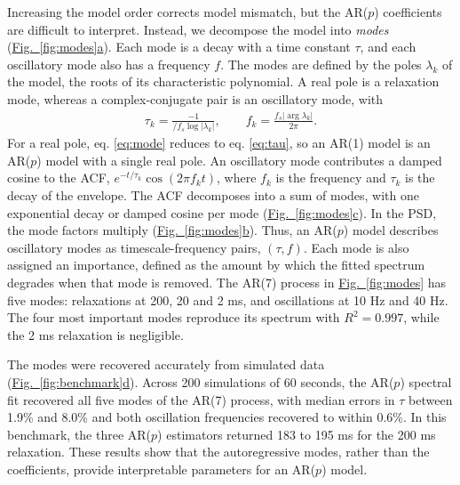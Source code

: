 \documentclass[pdflatex,sn-mathphys-num]{sn-jnl}
\newcommand{\figpanel}[2]{\hyperref[#1]{Fig.~\ref*{#1}#2}}
\begin{document}
Increasing the model order corrects model mismatch, but the AR($p$) coefficients are difficult to interpret. Instead, we decompose the model into \emph{modes} (\figpanel{fig:modes}{a}). Each mode is a decay with a time constant $\tau$, and each oscillatory mode also has a frequency $f$. The modes are defined by the poles $\lambda_k$ of the model, the roots of its characteristic polynomial. A real pole is a relaxation mode, whereas a complex-conjugate pair is an oscillatory mode, with
\begin{align}
\tau_k = \frac{-1}{/f_s \log|\lambda_k|}, \qquad f_k = \frac{f_s |\arg \lambda_k|}{2\pi}. \label{eq:mode}
\end{align}
For a real pole, eq. \ref{eq:mode} reduces to eq. \ref{eq:tau}, so an AR(1) model is an AR($p$) model with a single real pole. An oscillatory mode contributes a damped cosine to the ACF, $e^{-t/\tau_k}\cos(2\pi f_k t)$, where $f_k$ is the frequency and $\tau_k$ is the decay of the envelope. The ACF decomposes into a sum of modes, with one exponential decay or damped cosine per mode (\figpanel{fig:modes}{c}). In the PSD, the mode factors multiply (\figpanel{fig:modes}{b}). Thus, an AR($p$) model describes oscillatory modes as timescale-frequency pairs, $(\tau, f)$. Each mode is also assigned an importance, defined as the amount by which the fitted spectrum degrades when that mode is removed. The AR(7) process in \figpanel{fig:modes}{} has five modes: relaxations at 200, 20 and 2 ms, and oscillations at 10 Hz and 40 Hz. The four most important modes reproduce its spectrum with $R^2 = 0.997$, while the 2 ms relaxation is negligible.

The modes were recovered accurately from simulated data (\figpanel{fig:benchmark}{d}). Across 200 simulations of 60 seconds, the AR($p$) spectral fit recovered all five modes of the AR(7) process, with median errors in $\tau$ between 1.9\% and 8.0\% and both oscillation frequencies recovered to within 0.6\%. In this benchmark, the three AR($p$) estimators returned 183 to 195 ms for the 200 ms relaxation. These results show that the autoregressive modes, rather than the coefficients, provide interpretable parameters for an AR($p$) model.
\end{document}
